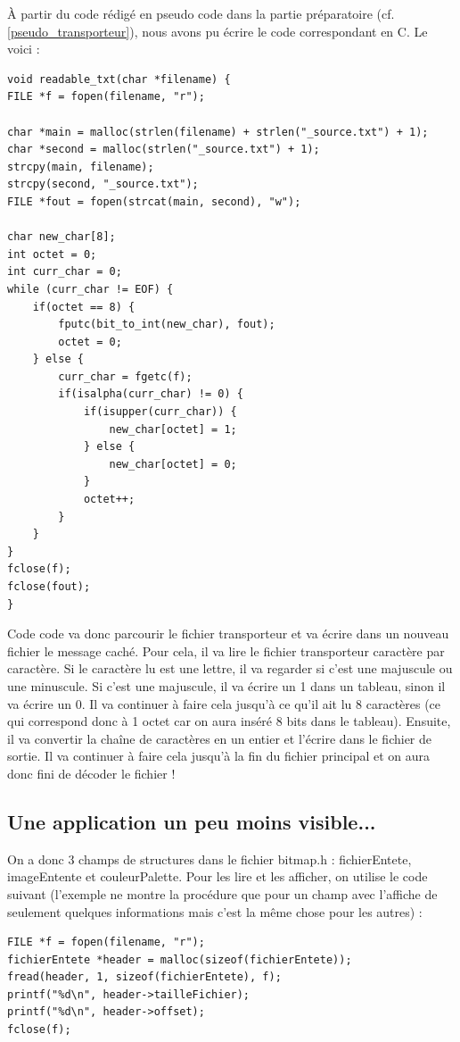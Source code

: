 \documentclass[12pt]{article}
\begin{document}
À partir du code rédigé en pseudo code dans la partie préparatoire (cf. \ref{pseudo_transporteur}), nous avons pu écrire le code correspondant en C. Le voici :
\begin{lstlisting}[style=languageClarge, caption=Code décodage fichier txt]
void readable_txt(char *filename) {
FILE *f = fopen(filename, "r");

char *main = malloc(strlen(filename) + strlen("_source.txt") + 1);
char *second = malloc(strlen("_source.txt") + 1);
strcpy(main, filename);
strcpy(second, "_source.txt");
FILE *fout = fopen(strcat(main, second), "w");

char new_char[8];
int octet = 0;
int curr_char = 0;
while (curr_char != EOF) {
    if(octet == 8) {
        fputc(bit_to_int(new_char), fout);
        octet = 0;
    } else {
        curr_char = fgetc(f);
        if(isalpha(curr_char) != 0) {
            if(isupper(curr_char)) {
                new_char[octet] = 1;
            } else {
                new_char[octet] = 0;
            }
            octet++;
        }
    }
}
fclose(f);
fclose(fout);
}
\end{lstlisting}
Code code va donc parcourir le fichier transporteur et va écrire dans un nouveau fichier le message caché. Pour cela, il va lire le fichier transporteur caractère par caractère. Si le caractère lu est une lettre, il va regarder si c'est une majuscule ou une minuscule. Si c'est une majuscule, il va écrire un 1 dans un tableau, sinon il va écrire un 0. Il va continuer à faire cela jusqu'à ce qu'il ait lu 8 caractères (ce qui correspond donc à 1 octet car on aura inséré 8 bits dans le tableau). Ensuite, il va convertir la chaîne de caractères en un entier et l'écrire dans le fichier de sortie. Il va continuer à faire cela jusqu'à la fin du fichier principal et on aura donc fini de décoder le fichier !

\subsection{Une application un peu moins visible...}
On a donc 3 champs de structures dans le fichier bitmap.h : fichierEntete, imageEntente et couleurPalette.
Pour les lire et les afficher, on utilise le code suivant (l'exemple ne montre la procédure que pour un champ avec l'affiche de seulement quelques informations mais c'est la même chose pour les autres) :
\begin{lstlisting}[style=languageClarge, caption=Code pour lire un champ de la structure bitmap]
FILE *f = fopen(filename, "r");
fichierEntete *header = malloc(sizeof(fichierEntete));
fread(header, 1, sizeof(fichierEntete), f);
printf("%d\n", header->tailleFichier);
printf("%d\n", header->offset);
fclose(f);
\end{lstlisting}
\end{document}

